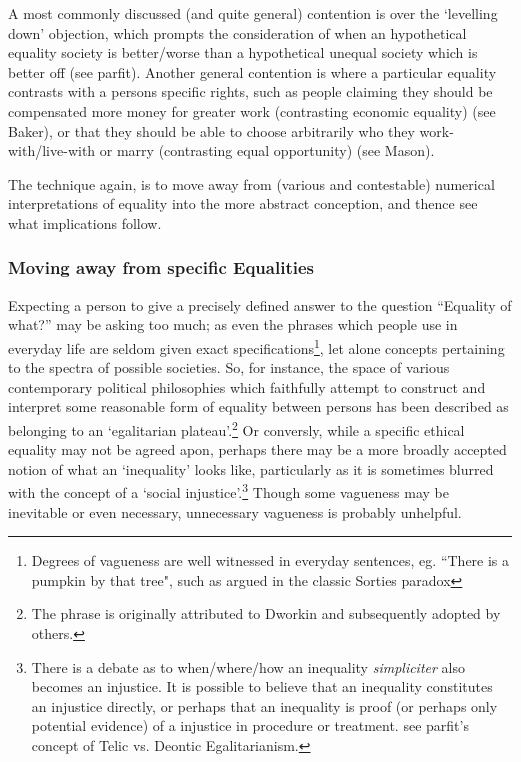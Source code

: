 \documentclass{article}
\begin{document}
A most commonly discussed (and quite general) contention is over the `levelling down' objection, which prompts the consideration of when an hypothetical equality society is better/worse than a hypothetical unequal society which is better off (see parfit). Another general contention is where a particular equality contrasts with a persons specific rights, such as people claiming they should be compensated more money for greater work (contrasting economic equality) (see Baker), or that they should be able to choose arbitrarily who they work-with/live-with or marry (contrasting equal opportunity) (see Mason).


The technique again, is to move away from (various and contestable) numerical interpretations of equality into the more abstract conception, and thence see what implications follow.

\subsubsection{Moving away from specific Equalities}


Expecting a person to give a precisely defined answer to the question ``Equality of what?'' may be asking too much; as even the phrases which people use in everyday life are seldom given exact specifications\footnote{Degrees of vagueness are well witnessed in everyday sentences, eg. ``There is a pumpkin by that tree", such as argued in the classic Sorties paradox\cite{frances_2018}}, let alone concepts pertaining to the spectra of possible societies.
So, for instance, the space of various contemporary political philosophies which faithfully attempt to construct and interpret some reasonable form of equality between persons has been described as belonging to an `egalitarian plateau'.\footnote{The phrase is originally attributed to Dworkin and subsequently adopted by others.}\cite{Brown2007}
Or conversly, while a specific ethical equality may not be agreed apon, perhaps there may be a more broadly accepted notion of what an `inequality' looks like,
particularly as it is sometimes blurred with the concept of a `social injustice'.\footnote{There is a debate as to when/where/how an inequality \textit{simpliciter} also becomes an injustice. It is possible to believe that an inequality constitutes an injustice directly, or perhaps that an inequality is proof (or perhaps only potential evidence) of a injustice in procedure or treatment. see parfit's concept of Telic vs. Deontic Egalitarianism.}
Though some vagueness may be inevitable or even necessary, unnecessary vagueness is probably unhelpful.
\end{document}

